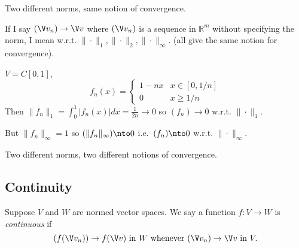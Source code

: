\documentclass[a4paper]{article}
\theoremstyle{definition}
\begin{document}
\begin{remark}
  Two different norms, same notion of convergence.
\end{remark}

\begin{convention}
  If I say $(\V v_n)\to \V v$ where $(\V v_n)$ is a sequence in $\mathbb{R}^m$ without specifying the norm, I mean w.r.t. $\|\cdot\|_1,\|\cdot\|_2,\|\cdot\|_\infty$. (all give the same notion for convergence).
\end{convention}

\begin{eg}\label{eg:fdown}
  $V=C[0,1]$,
  \[
    f_n(x) =
    \begin{cases}
      1-nx & x\in[0,1/n] \\
      0 & x\geq 1/n
    \end{cases}
  \]
  Then $\|f_n\|_1=\int_0^1|f_n(x)| dx=\frac{1}{2n}\to 0$ so $(f_n)\to 0$ w.r.t. $\|\cdot\|_1$.

  But $\|f_n\|_\infty=1$ so $(\|f_n\|_\infty) \nto 0$ i.e.\ $(f_n) \nto 0$ w.r.t. $\|\cdot\|_\infty$.
\end{eg}

\begin{remark}
  Two different norms, two different notions of convergence.
\end{remark}

\subsection{Continuity}

\begin{definition}[Continuity]
  Suppose $V$ and $W$ are normed vector spaces. We say a function $f:V\to W$ is \emph{continuous} if
  \[
    (f(\V v_n))\to f(\V v) \text{ in } W \text{ whenever } (\V v_n)\to \V v \text{ in } V.
  \]
  
\end{definition}
\end{document}
